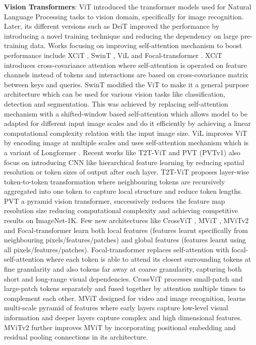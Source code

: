 \documentclass{article} \usepackage{iclr2022_conference,times}
\begin{document}
\textbf{Vision Transformers}: 
ViT \citep{dosovitskiy2020image} introduced the transformer models used for Natural Language Processing tasks to vision domain, specifically for image recognition. 
Later, its different versions such as DeiT \citep{touvron2021training} improved the performance by introducing a novel training technique and reducing the dependency on large pre-training data.  
Works focusing on improving self-attention mechanism to boost performance include XCiT \citep{ali2021xcit}, SwinT \citep{liu2021swin}, ViL \citep{zhang2021multi} and Focal-transformer \citep{yang2021focal}.
XCiT introduces cross-covariance attention where self-attention is operated on feature channels instead of tokens and interactions are based on cross-covariance matrix between keys and queries.
SwinT modified the ViT to make it a general purpose architecture which can be used for various vision tasks like classification, detection and segmentation. 
This was achieved by replacing self-attention mechanism with a shifted-window based self-attention which allows model to be adapted for different input image scales and do it efficiently by achieving a linear computational complexity relation with the input image size.
ViL improves ViT by encoding image at multiple scales and uses self-attention mechanism which is a variant of Longformer \citep{beltagy2020longformer}.
Recent works like T2T-ViT \citep{yuan2021tokens} and PVT (PVTv1) \citep{wang2021pyramid}  also focus on introducing CNN like hierarchical feature learning by reducing spatial resolution or token sizes of output after each layer.
T2T-ViT proposes layer-wise token-to-token transformation where neighbouring tokens are recursively aggregated into one token to capture local structure and reduce token lengths.
PVT a pyramid vision transformer, successively reduces the feature map resolution size reducing computational complexity and achieving competitive results on ImageNet-1K.
Few new architectures like CrossViT \citep{chen2021crossvit}, MViT \citep{fan2021multiscale}, MViTv2  \citep{li2022mvitv2} and Focal-transformer  \citep{yang2021focal} learn both local features (features learnt specifically from neighbouring pixels/features/patches) and global features (features learnt using all pixels/features/patches).
Focal-transformer replaces self-attention with focal-self-attention where each token is able to attend its closest surrounding tokens at fine granularity and also tokens far away at coarse granularity, capturing both short and long-range visual dependencies.
CrossViT processes small-patch and large-patch tokens separately and fused together by attention multiple times to complement each other.
MViT designed for video and image recognition, learns multi-scale pyramid of features where early layers capture low-level visual information and deeper layers capture complex and high dimensional features. 
MViTv2 further improves MViT by incorporating positional embedding and residual pooling connections in its architecture. 
\end{document}
